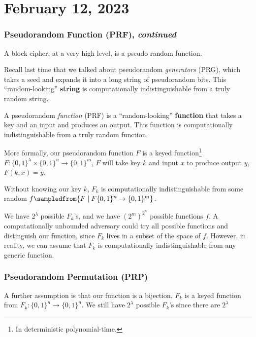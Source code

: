 \section{February 12, 2023}
\label{20240212}

\subsubsection{Pseudorandom Function (PRF), \emph{continued}}

A block cipher, at a very high level, is a pseudo random function.

Recall last time that we talked about pseudorandom \emph{generators} (PRG), which takes a seed and expands it into a long string of pseudorandom bits. This ``random-looking'' \textbf{string} is computationally indistinguishable from a truly random string.

A pseudorandom \emph{function} (PRF) is a ``random-looking'' \textbf{function} that takes a key and an input and produces an output. This function is computationally indistinguishable from a truly random function.

More formally, our pseudorandom function $F$ is a keyed function\footnote{In deterministic polynomial-time.} $F : \{0, 1\}^\lambda\times \{0, 1\}^n\to\{0, 1\}^m$, $F$ will take key $k$ and input $x$ to produce output $y$, $F(k, x) = y$.

Without knowing our key $k$, $F_k$ is computationally indistinguishable from some random $f\sampledfrom\{F\mid F\{0, 1\}^n\to \{0, 1\}^m\}$.


We have $2^\lambda$ possible $F_k$'s, and we have $(2^m)^{2^n}$ possible functions $f$. A computationally unbounded adversary could try all possible functions and distinguish our function, since $F_k$ lives in a subset of the space of $f$. However, in reality, we can assume that $F_k$ is computationally indistinguishable from any generic function.

\subsubsection{Pseudorandom Permutation (PRP)}

A further assumption is that our function is a bijection. $F_k$ is a keyed function from $F_k : \{0, 1\}^n\to\{0, 1\}^n$. We still have $2^\lambda$ possible $F_k$'s since there are $2^\lambda$

